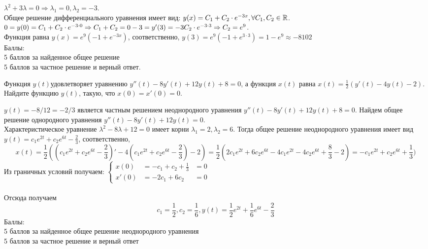 \documentclass[addpoints, answers]{exam} %
\begin{document}
\begin{questions}
   \begin{solution}
$\lambda^2+3\lambda=0 \Rightarrow \lambda_1=0, \lambda_2=-3.$ \\
Общее решение дифференциального уравнения имеет вид: $y(x)=C_1+C_2\cdot e^{-3x}, \forall C_1,C_2 \in \mathbb R$.\\
$0=y(0)=C_1+C_2\cdot e^{-3\cdot 0} \Rightarrow C_1+C_2=0\\
-3=y'(3)=-3C_2\cdot e^{-3\cdot 3}\Rightarrow C_2=e^9$.\\
 Функция равна $y(x)=e^9(-1+e^{-3x})$, соответственно, $y(3)=e^9(-1+e^{3\cdot3})=1-e^9\approx -8102$\\
Баллы:\\
5 баллов за найденное общее решение\\
5 баллов за частное решение и верный ответ.
   \end{solution}

\question[10] Функция $y(t)$удовлетворяет уравнению $y''(t)-8y'(t)+12y(t)+8=0$, а функция $x(t)$ равна $x(t)=\frac{1}{2}(y'(t)-4y(t)-2)$. Найдите функцию  $y(t)$, такую, что $x(0)=x'(0)=0$.\\

   \begin{solution}
$y(t)=-8/12=-2/3$ является частным решением неоднородного уравнения $y''(t)-8y'(t)+12y(t)+8=0$. Найдем общее решение однородного уравнения $y''(t)-8y'(t)+12y(t)=0$.\\
Характеристическое уравнение $\lambda^2-8\lambda+12=0$ имеет корни $\lambda_1=2, \lambda_2=6$. Тогда общее решение неоднородного уравнения имеет вид $y(t)=c_1e^{2t}+c_2e^{6t}-\frac{2}{3}$, соответственно,
\[
x(t)=\frac{1}{2}\left((c_1e^{2t}+c_2e^{6t}-\frac{2}{3})'-4(c_1e^{2t}+c_2e^{6t}-\frac{2}{3})-2\right)=\frac{1}{2}(2c_1e^{2t}+6c_2e^{6t}-4c_1e^{2t}-4c_2e^{6t}+\frac{8}{3}-2)=-c_1e^{2t}+c_2e^{6t}+\frac{1}{3})
\]
Из граничных условий получаем: $\left\{\begin{aligned}
x(0) &=-c_1+c_2+\frac{1}{3}&=0\\
x'(0)&=-2c_1+6c_2 &=0
\end{aligned}\right.$\\\\
Отсюда получаем
\[
c_1=\frac{1}{2}, c_2=\frac{1}{6}, y(t)=\frac{1}{2}e^{2t}+\frac{1}{6}e^{6t}-\frac{2}{3}
\]
Баллы:\\
5 баллов за найденное общее решение неоднородного уравнения\\
5 баллов за частное решение и верный ответ
   \end{solution}


\end{questions}
\end{document}
